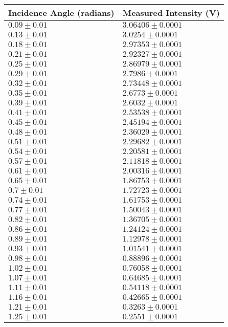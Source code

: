 \begin{tabular}{| p{} | p{} |}
\hline
Incidence Angle (radians) & Measured Intensity (V)\\
\hline
$0.09 \pm 0.01$ & $3.06406 \pm 0.0001$\\
$0.13 \pm 0.01$ & $3.0254 \pm 0.0001$\\
$0.18 \pm 0.01$ & $2.97353 \pm 0.0001$\\
$0.21 \pm 0.01$ & $2.92327 \pm 0.0001$\\
$0.25 \pm 0.01$ & $2.86979 \pm 0.0001$\\
$0.29 \pm 0.01$ & $2.7986 \pm 0.0001$\\
$0.32 \pm 0.01$ & $2.73448 \pm 0.0001$\\
$0.35 \pm 0.01$ & $2.6773 \pm 0.0001$\\
$0.39 \pm 0.01$ & $2.6032 \pm 0.0001$\\
$0.41 \pm 0.01$ & $2.53538 \pm 0.0001$\\
$0.45 \pm 0.01$ & $2.45194 \pm 0.0001$\\
$0.48 \pm 0.01$ & $2.36029 \pm 0.0001$\\
$0.51 \pm 0.01$ & $2.29682 \pm 0.0001$\\
$0.54 \pm 0.01$ & $2.20581 \pm 0.0001$\\
$0.57 \pm 0.01$ & $2.11818 \pm 0.0001$\\
$0.61 \pm 0.01$ & $2.00316 \pm 0.0001$\\
$0.65 \pm 0.01$ & $1.86753 \pm 0.0001$\\
$0.7 \pm 0.01$ & $1.72723 \pm 0.0001$\\
$0.74 \pm 0.01$ & $1.61753 \pm 0.0001$\\
$0.77 \pm 0.01$ & $1.50043 \pm 0.0001$\\
$0.82 \pm 0.01$ & $1.36705 \pm 0.0001$\\
$0.86 \pm 0.01$ & $1.24124 \pm 0.0001$\\
$0.89 \pm 0.01$ & $1.12978 \pm 0.0001$\\
$0.93 \pm 0.01$ & $1.01541 \pm 0.0001$\\
$0.98 \pm 0.01$ & $0.88896 \pm 0.0001$\\
$1.02 \pm 0.01$ & $0.76058 \pm 0.0001$\\
$1.07 \pm 0.01$ & $0.64685 \pm 0.0001$\\
$1.11 \pm 0.01$ & $0.54118 \pm 0.0001$\\
$1.16 \pm 0.01$ & $0.42665 \pm 0.0001$\\
$1.21 \pm 0.01$ & $0.3263 \pm 0.0001$\\
$1.25 \pm 0.01$ & $0.2551 \pm 0.0001$\\
\hline
\end{tabular}\\
